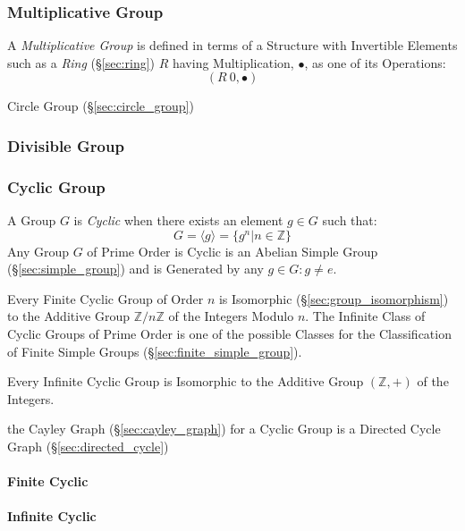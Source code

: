 \begin{itemize}
\subsubsection{Multiplicative Group}\label{sec:multiplicative_group}

A \emph{Multiplicative Group} is defined in terms of a Structure with
Invertible Elements such as a \emph{Ring} (\S\ref{sec:ring}) $R$
having Multiplication, $\bullet$, as one of its Operations:
\[
  (R \ {0}, \bullet)
\]

Circle Group (\S\ref{sec:circle_group})



\subsubsection{Divisible Group}\label{sec:divisible_group}

\subsubsection{Cyclic Group}\label{sec:cyclic_group}

A Group $G$ is \emph{Cyclic} when there exists an element $g \in G$ such that:
\[
    G = \langle g \rangle = \{ g^n | n \in \mathbb{Z} \}
\]
Any Group $G$ of Prime Order is Cyclic is an Abelian Simple Group
(\S\ref{sec:simple_group}) and is Generated by any $g \in G : g \neq
e$.

Every Finite Cyclic Group of Order $n$ is Isomorphic
(\S\ref{sec:group_isomorphism}) to the Additive Group $\mathbb{Z}/n\mathbb{Z}$
of the Integers Modulo $n$. The Infinite Class of Cyclic Groups of Prime Order
is one of the possible Classes for the Classification of Finite Simple Groups
(\S\ref{sec:finite_simple_group}).

Every Infinite Cyclic Group is Isomorphic to the Additive Group $(\mathbb{Z},
+)$ of the Integers.

the Cayley Graph (\S\ref{sec:cayley_graph}) for a Cyclic Group is a
Directed Cycle Graph (\S\ref{sec:directed_cycle})



\paragraph{Finite Cyclic}\label{sec:finite_cyclic}\hfill

\paragraph{Infinite Cyclic}\label{sec:infinite_cyclic}\hfill


\end{itemize}
